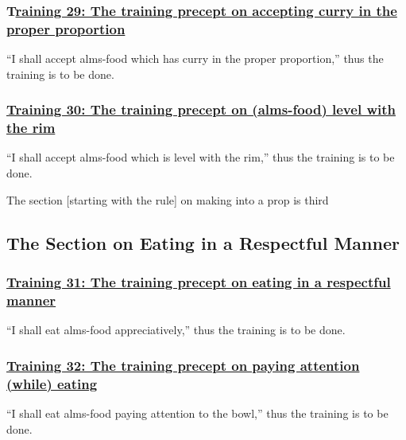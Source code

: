 \subsubsection*{T\hyperref[sekh29]{raining 29: The training precept on accepting curry in the proper proportion}}
\label{training29}
``I shall accept alms-food which has curry in the proper proportion,'' thus the training is to be done.



\subsubsection*{\hyperref[sekh30]{Training 30: The training precept on (alms-food) level with the rim}}
\label{training30}
``I shall accept alms-food which is level with the rim,'' thus the training is to be done.

\begin{center}
	The section [starting with the rule] on making into a prop is third
\end{center}



\setsubsecheadstyle{\subsectionFmt}
\subsection{The Section on Eating in a Respectful Manner}

\subsubsection*{\hyperref[sekh31]{Training 31: The training precept on eating in a respectful manner}}
\label{training31}
``I shall eat alms-food appreciatively,'' thus the training is to be done.



\subsubsection*{\hyperref[sekh32]{Training 32: The training precept on paying attention (while) eating}}
\label{training32}
``I shall eat alms-food paying attention to the bowl,'' thus the training is to be done.



